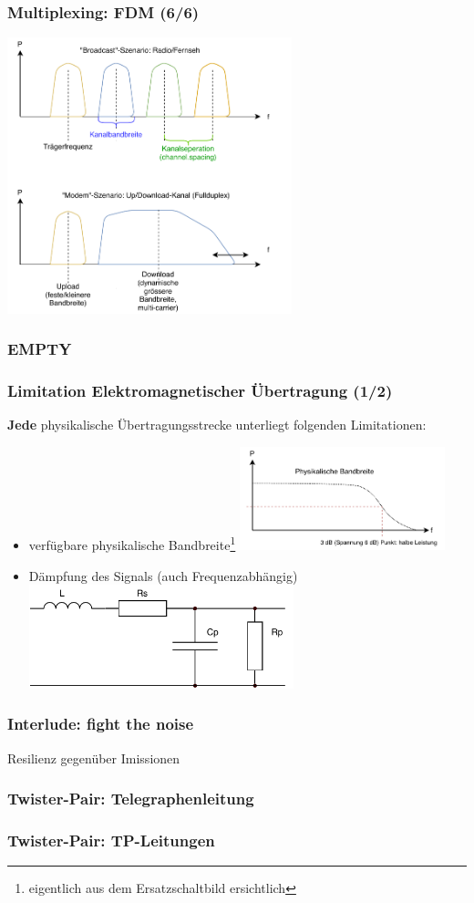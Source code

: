 \documentclass[ignorenonframetext]{beamer}
\begin{document}
\begin{frame}
\frametitle{Multiplexing: FDM (6/6)}
\includegraphics[height=8cm]{fm-spectra}
\end{frame}








\begin{frame}
\frametitle{EMPTY}
\end{frame}









\begin{frame}
\frametitle{Limitation Elektromagnetischer \"Ubertragung (1/2)}
{\bfseries Jede} physikalische \"Ubertragungsstrecke unterliegt folgenden Limitationen:

\begin{itemize}
  \item verf\"ugbare physikalische Bandbreite\footnote{eigentlich aus dem Ersatzschaltbild ersichtlich} \includegraphics[height=3cm]{bandwidth}
  \item D\"ampfung des Signals (auch Frequenzabh\"angig) \includegraphics[height=3cm]{line-circuit}
\end{itemize}
\end{frame}



\begin{frame}
\frametitle{Interlude: fight the noise}
Resilienz gegen\"uber Imissionen
\end{frame}



\begin{frame}
\frametitle{Twister-Pair: Telegraphenleitung}
\end{frame}



\begin{frame}
\frametitle{Twister-Pair: TP-Leitungen}
\end{frame}
\end{document}
